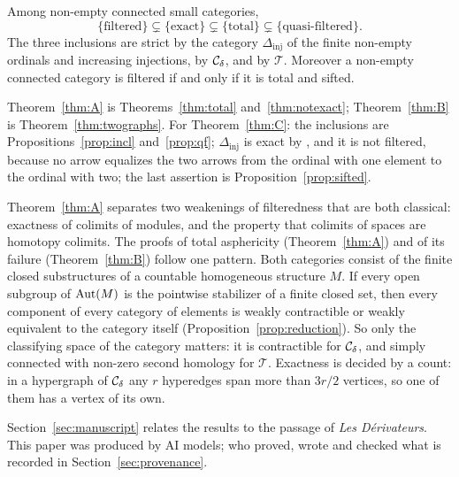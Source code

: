 \begin{theorem}\label{thm:C}
Among non-empty connected small categories,
\[
 \{\text{filtered}\}\subsetneq\{\text{exact}\}\subsetneq\{\text{total}\}
 \subsetneq\{\text{quasi-filtered}\}.
\]
The three inclusions are strict by the category $\Delta_{\mathrm{inj}}$ of
the finite non-empty ordinals and increasing injections, by $\mathcal{C}_{\delta}$, and by
$\mathcal T$. Moreover a non-empty connected category is filtered if and
only if it is total and sifted.
\end{theorem}

Theorem~\ref{thm:A} is Theorems~\ref{thm:total} and~\ref{thm:notexact};
Theorem~\ref{thm:B} is Theorem~\ref{thm:twographs}. For
Theorem~\ref{thm:C}: the inclusions are Propositions~\ref{prop:incl}
and~\ref{prop:qf}; $\Delta_{\mathrm{inj}}$ is exact by
\cite[Theorems~1 and~3]{IM73}, and it is not filtered, because no arrow
equalizes the two arrows from the ordinal with one element to the ordinal
with two; the last assertion is Proposition~\ref{prop:sifted}.

Theorem~\ref{thm:A} separates two weakenings of filteredness that are both
classical: exactness of colimits of modules, and the property that colimits of
spaces are homotopy colimits. The proofs of total asphericity
(Theorem~\ref{thm:A}) and of its failure (Theorem~\ref{thm:B}) follow one
pattern. Both categories consist of the finite closed substructures of a
countable homogeneous structure $M$. If every open subgroup of $\operatorname{Aut}(M)$ is
the pointwise stabilizer of a finite closed set, then every component of
every category of elements is weakly contractible or weakly equivalent to
the category itself (Proposition~\ref{prop:reduction}). So only the
classifying space of the category matters: it is contractible for $\mathcal{C}_{\delta}$, and
simply connected with non-zero second homology for $\mathcal T$. Exactness is
decided by a count: in a hypergraph of $\mathcal{C}_{\delta}$ any $r$ hyperedges span more
than $3r/2$ vertices, so one of them has a vertex of its own.

Section~\ref{sec:manuscript} relates the results to the passage of
\emph{Les D\'erivateurs}. This paper was produced by AI models; who proved,
wrote and checked what is recorded in Section~\ref{sec:provenance}.
